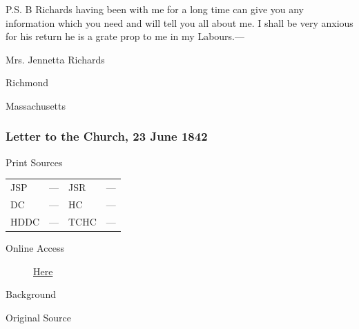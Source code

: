 				P.S. B Richards having been with me for a long time can give you any information which you need and will tell you all about me. I shall be very anxious for his return he is a grate prop to me in my Labours.---

				Mrs. Jennetta Richards

				Richmond

				Massachusetts
				
		\subsubsection{Letter to the Church, 23 June 1842}
			\label{EMS-1842-JS-23-JUN-1842-C}
			
			\begin{description}
				\item[Print Sources]
			\end{description}

			\begin{tabular}{p{0.5in}p{1in}p{0.5in}p{1in}}
				JSP	 	& ---		& JSR 		& --- \\
				DC	 	& ---		& HC 		& --- \\
				HDDC 	& ---		& TCHC 		& --- \\
			\end{tabular}
			
			\begin{description}
				\item[Online Access] \href{https://www.josephsmithpapers.org/paper-summary/letter-to-the-church-23-june-1842/1}{Here}
			\end{description}
			
			\begin{description}
				\item[Background]
			\end{description}
			
			
			\begin{description}
				\item[Original Source]
			\end{description}
			
